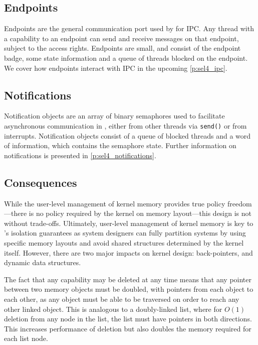 \subsection{Endpoints}
\label{s:endpoints}

Endpoints are the general communication port used by \selfour for \gls{IPC}.
Any thread with a
capability to an endpoint can send and receive messages on that endpoint, subject to the access
rights. Endpoints are small, and consist of the endpoint badge, some state information and a queue
of threads blocked on the endpoint. We cover how endpoints interact with IPC in the upcoming
\cref{p:sel4_ipc}. 

\subsection{Notifications}

Notification objects are an array of binary semaphores used to facilitate asynchronous communication in \selfour, either from other threads via \texttt{send()} or from
interrupts. Notification objects consist of a queue of blocked threads and a word of information,
which contains the semaphore state. Further information on notifications is presented in
\cref{p:sel4_notifications}. 

\subsection{Consequences}

While the user-level management of kernel memory provides true policy freedom---there is no
policy required by the kernel on memory layout---this design is not without trade-offs. Ultimately,
user-level management of kernel memory is key to \selfour's isolation
guarantees as system designers can fully partition systems by using specific memory layouts and
avoid shared structures determined by the kernel itself. However, there are two major impacts on kernel 
design: back-pointers, and dynamic data structures. 

The fact that any capability may be deleted at any time means that any pointer between two memory
objects must be doubled, with pointers from each object to each other, as any object must be able to be
traversed on order to reach any other linked object. This is analogous to a doubly-linked list,
where for $O(1)$ deletion from any node in the list, the list must have pointers in both directions.
This increases performance of deletion but also doubles the memory required for each list node. 

